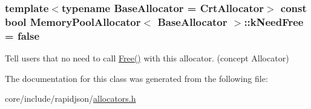 \subsubsection[{\texorpdfstring{k\+Need\+Free}{kNeedFree}}]{\setlength{\rightskip}{0pt plus 5cm}template$<$typename Base\+Allocator  = Crt\+Allocator$>$ const bool {\bf Memory\+Pool\+Allocator}$<$ Base\+Allocator $>$\+::k\+Need\+Free = false\hspace{0.3cm}{\ttfamily [static]}}\hypertarget{classMemoryPoolAllocator_ab4c7c5c631e451689bc9da392a65194f}{}\label{classMemoryPoolAllocator_ab4c7c5c631e451689bc9da392a65194f}


Tell users that no need to call \hyperlink{classMemoryPoolAllocator_a6b180eb150451b4df8b70d827cd1191c}{Free()} with this allocator. (concept Allocator) 



The documentation for this class was generated from the following file\+:\begin{DoxyCompactItemize}
\item 
core/include/rapidjson/\hyperlink{allocators_8h}{allocators.\+h}\end{DoxyCompactItemize}
